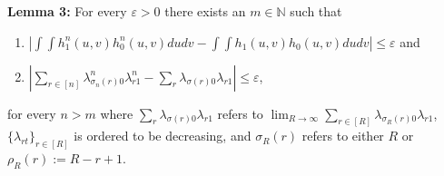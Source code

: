 \documentclass[12pt]{article}
\theoremstyle{definition}
\begin{document}
\begin{flushleft}
\textbf{Lemma 3:} For every $\varepsilon > 0$ there exists an $m \in \mathbb{N}$ such that  
\begin{enumerate}
\item[i.] $\left|\int\int h^{n}_{1}(u,v)h^{n}_{0}(u,v)dudv -  \int\int h_{1}(u,v)h_{0}(u,v)dudv\right| \leq \varepsilon$ and
\item[ii.] $\left|\sum_{r \in [n]}\lambda^{n}_{\sigma_{n}(r)0}\lambda^{n}_{r1} - \sum_{r}\lambda_{\sigma(r)0}\lambda_{r1}\right| \leq \varepsilon$, 
\end{enumerate}
for every $n > m$ where $\sum_{r}\lambda_{\sigma(r)0}\lambda_{r1}$ refers to $\lim_{R \to \infty}\sum_{r\in [R]}\lambda_{\sigma_{R}(r)0}\lambda_{r1}$, $\{\lambda_{rt}\}_{r \in [R]}$ is ordered to be decreasing, and $\sigma_{R}(r)$ refers to either $R$ or $\rho_{R}(r) := R-r+1$. %
\end{flushleft}
\end{document}
